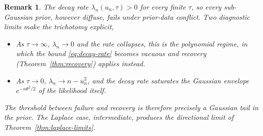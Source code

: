 \documentclass{article}%
\newtheorem{remark}[theorem]{Remark}
\newcommand{\1}{\mathbf{1}}
\begin{document}
 
\begin{remark}
The decay rate $\lambda_{n}(u_{n},\tau)>0$ for every finite $\tau$, so every sub-Gaussian prior, however diffuse, fails under prior-data conflict. Two diagnostic limits make the trichotomy explicit,
\begin{itemize}
\item As $\tau\to\infty$, $\lambda_{n}\to 0$ and the rate collapses, this is the polynomial regime, in which the bound \eqref{eq:decay-rate} becomes vacuous and recovery (Theorem~\ref{thm:recovery}) applies instead.
\item As $\tau\to 0$, $\lambda_{n}\to n-u_{n}^{2}$, and the decay rate saturates the Gaussian envelope $e^{-n\theta^{2}/2}$ of the likelihood itself.
\end{itemize}
The threshold between failure and recovery is therefore precisely a Gaussian tail in the prior. The Laplace case, intermediate, produces the directional limit of Theorem~\ref{thm:laplace-limits}.
\end{remark}
\end{document}
